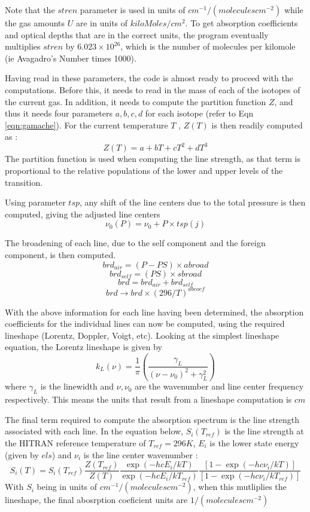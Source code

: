 \documentclass[11pt]{article}
\begin{document}
Note that the $stren$ parameter is used in units of 
$cm^{-1}/(moleculescm^{-2})$ while the gas amounts $U$ are in units of 
$kiloMoles/cm^{2}$. To get absorption coefficients and optical depths that 
are in the correct units, the program eventually multiplies $stren$ by 
$6.023 \times 10^{26}$, which is the number of molecules per kilomole
(ie Avagadro's Number times 1000). 

Having read in these parameters, the code is almost ready to proceed with 
the computations. Before this, it needs to read in the mass of each of the 
isotopes of the current gas. In addition, it needs to compute the 
partition function $Z$, and thus it needs four parameters $a, b, c, d$ for 
each isotope (refer to Eqn \ref{eqn:gamache}). For the current temperature 
$T$ , $Z(T)$ is then readily computed as : 
\[
Z(T ) = a + bT + cT^{2} + dT^{3}
\] 
The partition function is used when computing the line strength, as that 
term is proportional to the relative populations of the lower and upper 
levels of the transition. 

Using parameter $tsp$, any shift of the line centers due 
to the total pressure is then computed,  giving the adjusted line centers 
\[ 
\nu_{0}(P) = \nu_{0} + P \times tsp(j)
\]

The broadening of each line, due to the self component and the foreign 
component, is then computed. 
\[
brd_{air} = (P - PS) \times abroad
\]
\[
brd_{self} = (PS) \times sbroad
\]
\[
brd = brd_{air} + brd_{self}
\]
\[
brd \rightarrow brd \times (296/T)^{abcoef}
\]

With the above information for each line having been determined, the 
absorption coefficients for the individual lines can now be computed, 
using the required lineshape (Lorentz, Doppler, Voigt, etc). Looking at 
the simplest lineshape equation, the Lorentz lineshape is given by 
\[
 k_{L}(\nu)=\frac{1}{\pi}\left(\frac{\gamma_{L}}
{(\nu-\nu_{0})^{2}+\gamma_{L}^{2}}\right)
\]
where $\gamma_{L}$ is the linewidth and $\nu,\nu_{0}$ are the wavenumber
and line center frequency respectively. This means the units that result
from a lineshape computation is $cm$

The final term required to compute the absorption spectrum is the line
strength associated with each line. In the equation below, $S_{i}(T_{ref})$ 
is the line strength at the HITRAN reference temperature of $T_{ref} = 296K$, 
$E_{i}$ is the lower state energy (given by $els$) and $\nu_{i}$ is the line 
center wavenumber : 
\[
 S_i (T) = S_i (T_{ref})
 \frac{ Z(T_{ref}) }{ Z(T) }
 \frac{ \exp(-hcE_i /kT) }{ \exp(-hcE_i /kT_{ref}) }
 \frac{ [1-\exp(-hc\nu_i /kT)] }{ [1-\exp(-hc\nu_i /kT_{ref})] }
\]
With $S_{i}$ being in units of $cm^{-1}/(molecules cm^{-2})$, when this
mutliplies the lineshape, the final abosrption coeficient units are 
 $1/(molecules cm^{-2}) $
 
\end{document}
